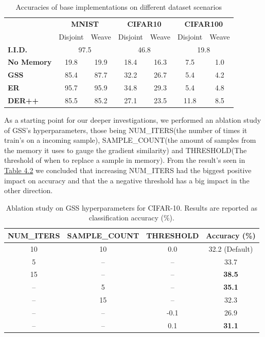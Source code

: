 \documentclass[oneside]{ctuthesis}
\begin{document}
\begin{table}[t]
    \centering
    \caption{Accuracies of base implementations on different dataset scenarios}
    \label{tab:overall_accuracy}
    \begin{tabular}{lcccccc}
        \toprule
        & \multicolumn{2}{c}{\textbf{MNIST}} & \multicolumn{2}{c}{\textbf{CIFAR10}} & \multicolumn{2}{c}{\textbf{CIFAR100}} \\
        & Disjoint & Weave & Disjoint & Weave & Disjoint & Weave \\
        \midrule
        \textbf{I.I.D.}    & \multicolumn{2}{c}{97.5} & \multicolumn{2}{c}{46.8} & \multicolumn{2}{c}{19.8} \\
        \arrayrulecolor{gray!80}
        \midrule
        \arrayrulecolor{black} 
        \textbf{No Memory} & 19.8 & 19.9 & 18.4  & 16.3  & 7.5  & 1.0 \\
        \textbf{GSS}       & 85.4 & 87.7 & 32.2  & 26.7  & 5.4  & 4.2 \\
        \textbf{ER}        & 95.7 & 95.9 & 34.8  & 29.3  & 5.4  & 4.8 \\
        \textbf{DER++}     & 85.5 & 85.2 & 27.1  & 23.5  & 11.8 & 8.5 \\
        \bottomrule
    \end{tabular}
\end{table}

As a starting point for our deeper investigations, we performed an ablation study of GSS's hyperparameters, those being NUM\_ITERS(the number of times it train's on a incoming sample), SAMPLE\_COUNT(the amount of samples from the memory it uses to gauge the gradient similarity) and THRESHOLD(The threshold of when to replace a sample in memory). From the result's seen in \hyperref[tab:gss-ablation]{Table 4.2} we concluded that increasing NUM\_ITERS had the biggest positive impact on accuracy and that the a negative threshold has a big impact in the other direction.

\begin{table}[t]
\centering
\caption{Ablation study on GSS hyperparameters for CIFAR-10. Results are reported as classification accuracy (\%).}
\label{tab:gss-ablation}
\begin{tabular}{ccc|c}
\toprule
\textbf{NUM\_ITERS} & \textbf{SAMPLE\_COUNT} & \textbf{THRESHOLD} & \textbf{Accuracy (\%)} \\
\midrule
10 & 10 & 0.0 & 32.2 (Default) \\
\arrayrulecolor{gray!80}
\midrule
\arrayrulecolor{black} 
5    & --   & --   & 33.7 \\
15    & --   & --   & \textbf{38.5} \\
\arrayrulecolor{gray!80}
\midrule
\arrayrulecolor{black} 
--    & 5   & --   & \textbf{35.1} \\
--    & 15   & --   & 32.3 \\
\arrayrulecolor{gray!80}
\midrule
\arrayrulecolor{black} 
--    & --   & -0.1   & 26.9 \\
--    & --   & 0.1   & \textbf{31.1} \\
\bottomrule
\end{tabular}
\end{table}
\end{document}
